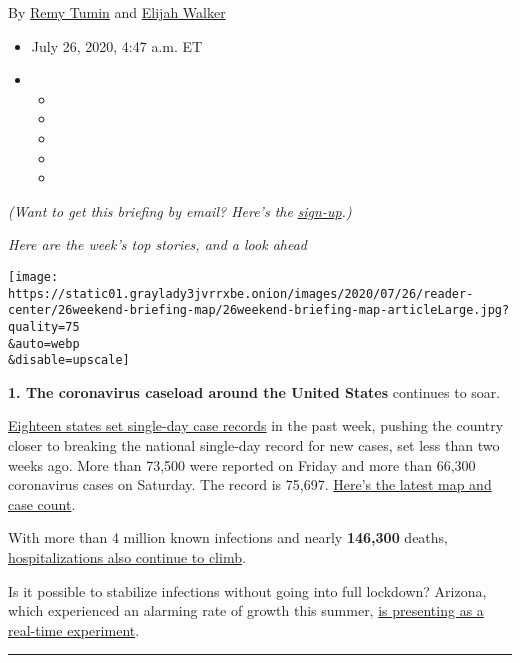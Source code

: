 By \href{https://www.nytimes3xbfgragh.onion/by/remy-tumin}{Remy Tumin}
and \href{https://www.nytimes3xbfgragh.onion/by/elijah-walker}{Elijah
Walker}

\begin{itemize}
\item
  July 26, 2020, 4:47 a.m. ET
\item
  \begin{itemize}
  \item
  \item
  \item
  \item
  \item
  \end{itemize}
\end{itemize}

\emph{(Want to get this briefing by email? Here's the}
\href{https://www.nytimes3xbfgragh.onion/morning-briefing}{\emph{sign-up}}\emph{.)}

\emph{Here are the week's top stories, and a look ahead}

\texttt{[image: https://static01.graylady3jvrrxbe.onion/images/2020/07/26/reader-center/26weekend-briefing-map/26weekend-briefing-map-articleLarge.jpg?quality=75\\\&auto=webp\\\&disable=upscale]}

\textbf{1. The coronavirus caseload around the United States} continues
to soar.

\href{https://www.nytimes3xbfgragh.onion/2020/07/25/world/coronavirus-covid-19.html?\#link-67763577}{Eighteen
states set single-day case records} in the past week, pushing the
country closer to breaking the national single-day record for new cases,
set less than two weeks ago. More than 73,500 were reported on Friday
and more than 66,300 coronavirus cases on Saturday. The record is
75,697.
\href{https://www.nytimes3xbfgragh.onion/interactive/2020/us/coronavirus-us-cases.html?a}{Here's
the latest map and case count}.

With more than 4 million known infections and nearly \textbf{146,300}
deaths,
\href{https://www.nytimes3xbfgragh.onion/interactive/2020/07/23/us/coronavirus-hospitalizations-us.html?}{hospitalizations
also continue to climb}.

Is it possible to stabilize infections without going into full lockdown?
Arizona, which experienced an alarming rate of growth this summer,
\href{https://www.nytimes3xbfgragh.onion/2020/07/24/us/coronavirus-arizona.html}{is
presenting as a real-time experiment}.

\begin{center}\rule{0.5\linewidth}{\linethickness}\end{center}

